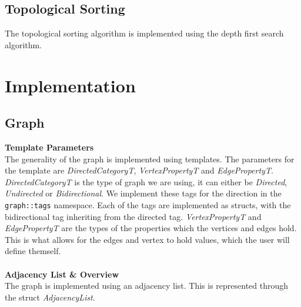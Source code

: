\documentclass{article}
\begin{document}
\subsection{Topological Sorting}

The topological sorting algorithm is implemented using the depth first search algorithm. 


\section{Implementation}

\subsection{Graph}
\textbf{Template Parameters}\\
\noindent
The generality of the graph is implemented using templates.
The parameters for the template are \textit{DirectedCategoryT}, \textit{VertexPropertyT} and \textit{EdgePropertyT}. 
\textit{DirectedCategoryT} is the type of graph we are using, it can either be \textit{Directed}, \textit{Undirected} or \textit{Bidirectional}. We implement these tags for the direction in the \texttt{graph::tags}  namespace. Each of the tags are implemented as structs, with the bidirectional tag inheriting from the directed tag.
\textit{VertexPropertyT} and \textit{EdgePropertyT} are the types of the properties which the vertices and edges hold. This is what allows for the edges and vertex to hold values, which the user will define themself.
\\\\
\textbf{Adjacency List \& Overview}\\
\noindent
The graph is implemented using an adjacency list. This is represented through the struct \textit{AdjacencyList}. 
\end{document}
